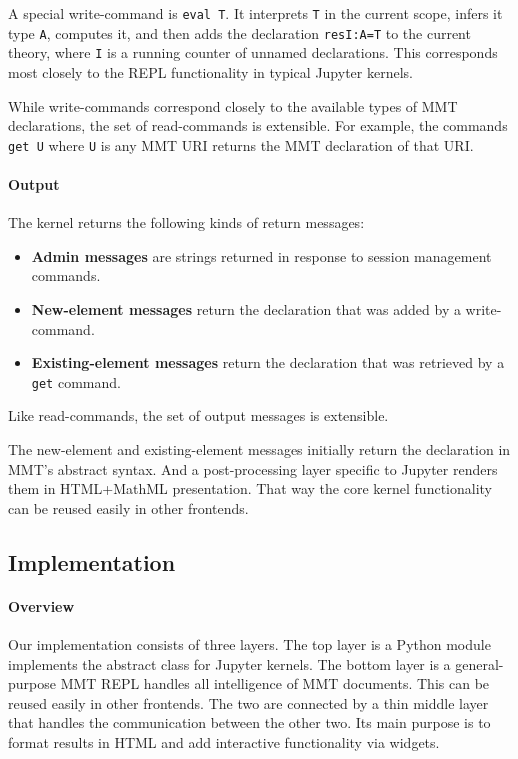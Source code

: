 A special write-command is \texttt{eval T}.
It interprets \texttt{T} in the current scope, infers it type \texttt{A}, computes it, and then adds the declaration \texttt{resI:A=T} to the current theory, where \texttt{I} is a running counter of unnamed declarations.
This corresponds most closely to the REPL functionality in typical Jupyter kernels.

While write-commands correspond closely to the available types of MMT declarations, the set of read-commands is extensible.
For example, the commands \texttt{get U} where \texttt{U} is any MMT URI returns the MMT declaration of that URI.

\paragraph{Output}
The kernel returns the following kinds of return messages:
\begin{itemize}
\item \textbf{Admin messages} are strings returned in response to session management commands.
\item \textbf{New-element messages} return the declaration that was added by a write-command.
\item \textbf{Existing-element messages} return the declaration that was retrieved by a \texttt{get} command.
\end{itemize}
Like read-commands, the set of output messages is extensible.

The new-element and existing-element messages initially return the declaration in MMT's abstract syntax.
And a post-processing layer specific to Jupyter renders them in HTML+MathML presentation.
That way the core kernel functionality can be reused easily in other frontends.

\subsection{Implementation}\label{sec:kernel:impl}

\paragraph{Overview}
Our implementation consists of three layers.
The top layer is a Python module implements the abstract class for Jupyter kernels.
The bottom layer is a general-purpose MMT REPL handles all intelligence of MMT documents.
This can be reused easily in other frontends.
The two are connected by a thin middle layer that handles the communication between the other two.
Its main purpose is to format results in HTML and add interactive functionality via widgets.

